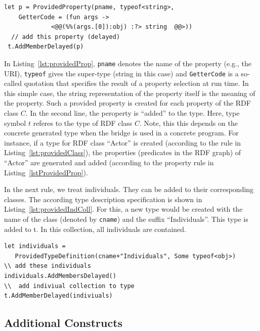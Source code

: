 \documentclass{llncs} %
\begin{document}
\begin{lstlisting}[style=code, caption={\texttt{Property Rule:} Add Property for Class C}, label={lst:providedProp}]
 let p = ProvidedProperty(pname, typeof<string>, 
    GetterCode = (fun args -> 
		     <@@(%%(args.[0]):obj) :?> string  @@>))
  // add this property (delayed)
 t.AddMemberDelayed(p)
 \end{lstlisting}

In Listing~\ref{lst:providedProp}, \texttt{pname} denotes the name of the property (e.g., the URI), \texttt{typeof} gives the
super-type (string in this case) and \texttt{GetterCode} is a so-called quotation that specifies the result of a property selection at run time.
In this simple case, the string representation of the property itself is the meaning of the property. Such a provided property
is created for each property of the RDF class $C$.
In the second line, the peroperty is ``added'' to the type. Here, type symbol $t$ referes to the
type of RDF class $C$. Note, this this depends on the concrete generated type 
when the bridge is used in a concrete program. For instance, if a type for RDF class ``Actor'' is created (according to the rule in Listing~\ref{lst:providedClass}),
the properties (predicates in the RDF graph) of ``Actor'' are generated and added (according to the property rule in Listing~\ref{lstProvidedProp}).

In the next rule, we treat individuals. They can be added to their corresponding classes.
The according type description specification is shown in Listing~\ref{lst:providedIndColl}.
For this, a new type would be created with the name of the class (denoted by \texttt{cname}) and the
suffix ``Individuals''. This type is added to t. In this collection, all individuals are contained.

\begin{lstlisting}[style=code, caption={\texttt{Individual Rule:} Add Individuals (set / collection) to Class C}, label={lst:providedIndColl}]
let individuals = 
   ProvidedTypeDefinition(cname+"Individuals", Some typeof<obj>)
\\ add these individuals
individuals.AddMembersDelayed()
\\  add indiviual collection to type 
t.AddMemberDelayed(indiviuals)
 \end{lstlisting}




\subsection{Additional Constructs}
\end{document}
